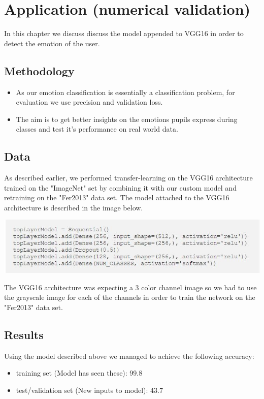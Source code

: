 \documentclass[runningheads,a4paper,11pt]{report}
\begin{document}
\chapter{Application (numerical validation)}
\label{chapter:application}

In this chapter we discuss discuss the model appended to VGG16 in order to detect the emotion of the user.

\section{Methodology}
\label{section:methodology}

\begin{itemize}
	\item As our emotion classification is essentially a classification problem, for evaluation we use precision and validation loss.
	\item The aim is to get better insights on the emotions pupils express during classes and test it's performance on real world data.
\end{itemize}

\section{Data}
\label{section:data}

As described earlier, we performed transfer-learning on the VGG16 architecture trained on the "ImageNet" set by combining it with our custom model and retraining on the "Fer2013" data set. The model attached to the VGG16 architecture is described in the image below.

\includegraphics[width=\linewidth]{./Fig/EmotionLayers.JPG}

The VGG16 architecture was expecting a 3 color channel image so we had to use the grayscale image for each of the channels in order to train the network on the "Fer2013" data set.

\section{Results}
\label{section:results}

Using the model described above we managed to achieve the following accuracy:
\begin{itemize}
    \item training set (Model has seen these): 99.8%
    \item test/validation set (New inputs to model): 43.7
\end{itemize}
\end{document}
